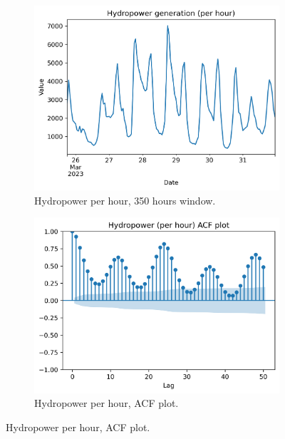 \begin{figure}[H]
\centering
    \begin{subfigure}{.43\textwidth}
        \centering
        \includegraphics[width=1\linewidth]{images/variable_analysis/esios_generation_hydro_h_96}
        \caption{Hydropower per hour, 350 hours window.}
        \label{fig:hydro-series}
    \end{subfigure}
    \begin{subfigure}{.45\textwidth}
        \centering
        \includegraphics[width=1\linewidth]{images/variable_analysis/esios_generation_hydro_h_acf}
        \caption{Hydropower per hour, ACF plot.}
        \label{fig:hydro-acf}
    \end{subfigure}
\end{figure}

